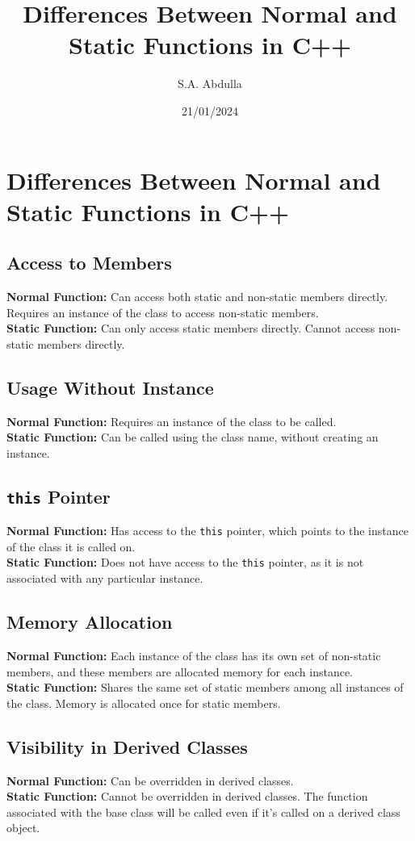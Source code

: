 \documentclass{article}
\title{Differences Between Normal and Static Functions in C++}
\author{S.A. Abdulla}
\date{21/01/2024}
\begin{document}
\maketitle
\newpage

\section*{Differences Between Normal and Static Functions in C++}
\subsection*{Access to Members}
\textbf{Normal Function:} Can access both static and non-static members directly. Requires an instance of the class to access non-static members. \\
\textbf{Static Function:} Can only access static members directly. Cannot access non-static members directly.

\subsection*{Usage Without Instance}
\textbf{Normal Function:} Requires an instance of the class to be called. \\
\textbf{Static Function:} Can be called using the class name, without creating an instance.

\subsection*{\texttt{this} Pointer}
\textbf{Normal Function:} Has access to the \texttt{this} pointer, which points to the instance of the class it is called on. \\
\textbf{Static Function:} Does not have access to the \texttt{this} pointer, as it is not associated with any particular instance.

\subsection*{Memory Allocation}
\textbf{Normal Function:} Each instance of the class has its own set of non-static members, and these members are allocated memory for each instance. \\
\textbf{Static Function:} Shares the same set of static members among all instances of the class. Memory is allocated once for static members.

\subsection*{Visibility in Derived Classes}
\textbf{Normal Function:} Can be overridden in derived classes. \\
\textbf{Static Function:} Cannot be overridden in derived classes. The function associated with the base class will be called even if it's called on a derived class object.
\end{document}
